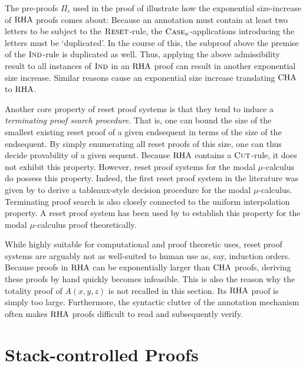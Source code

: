 The pre-proofs $\Pi_i$ used in the proof of  illustrate how the
exponential size-increase of $\mathrm{RHA}$ proofs
comes about: Because an annotation must contain at least two letters to be
subject to the $\textsc{Reset}$-rule, the $\textsc{Case}_x$-applications introducing the
letters must be `duplicated'. In the course of this, the subproof above the
premise of the $\textsc{Ind}$-rule is duplicated as well. Thus, applying the above
admissibility result to all instances of $\textsc{Ind}$ in an $\mathrm{RHA}$ proof can result
in another exponential size increase. Similar reasons cause an exponential size
increase translating $\mathrm{CHA}$ to $\mathrm{RHA}$.

Another core property of reset proof systems is that they tend to induce a
\emph{terminating proof search procedure}. That is, one can bound the size of the
smallest existing reset proof of a given endsequent in terms of the size of the
endsequent. By simply enumerating all reset proofs of this size, one can thus
decide provability of a given sequent. Because $\mathrm{RHA}$ contains a $\textsc{Cut}$-rule,
it does not exhibit this property. However, reset proof systems for the modal
$\mu$-calculus do possess this property. Indeed, the first reset proof system in
the literature was given by \textcite{jungteerapanichTableauSystemsModal2010}
to derive a tableaux-style
decision procedure for the modal $\mu$-calculus. Terminating proof search is also closely connected to the
uniform interpolation property. A reset proof system has been used by \textcite{afshariUniformInterpolationCyclic2021}
to establish this property for the modal
$\mu$-calculus proof theoretically.

While highly suitable for computational and proof theoretic uses, reset proof
systems are arguably not as well-suited to human use as, say, induction orders.
Because proofs in $\mathrm{RHA}$ can be exponentially larger than $\mathrm{CHA}$ proofs,
deriving these proofs by hand quickly becomes infeasible. This is also the
reason why the totality proof of $A(x, y, z)$ is not recalled in this section.
Its $\mathrm{RHA}$ proof is simply too large. Furthermore, the syntactic clutter of the
annotation mechanism often makes $\mathrm{RHA}$ proofs difficult to read and
subsequently verify.

\section{Stack-controlled Proofs}
\label{sec:sc-proofs}


